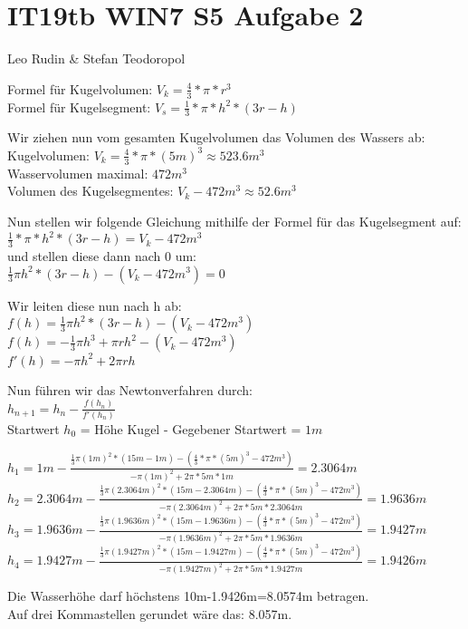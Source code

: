\documentclass{article}
\begin{document}
\section*{IT19tb WIN7 S5 Aufgabe 2}
Leo Rudin \& Stefan Teodoropol

Formel für Kugelvolumen: \(V_k = \frac{4}{3}*\pi*r^3\)\\
Formel für Kugelsegment: \(V_s = \frac{1}{3}*\pi*h^2*(3r-h)\)

Wir ziehen nun vom gesamten Kugelvolumen das Volumen des Wassers ab:\\
Kugelvolumen: \(V_k = \frac{4}{3}*\pi*(5m)^3 \approx 523.6m^3\)\\
Wasservolumen maximal: \(472m^3\)\\
Volumen des Kugelsegmentes: \(V_k - 472m^3 \approx 52.6m^3\)

Nun stellen wir folgende Gleichung mithilfe der Formel für das Kugelsegment auf:\\
\(\frac{1}{3}*\pi*h^2*(3r-h) = V_k - 472m^3\)\\
und stellen diese dann nach 0 um:\\
\(\frac{1}{3} \pi h^2*(3r-h) - (V_k - 472m^3) = 0\)

Wir leiten diese nun nach h ab:\\
\(f(h) = \frac{1}{3} \pi h^2*(3r-h) - (V_k - 472m^3)\)\\
\(f(h) = - \frac{1}{3} \pi h^3 + \pi r h^2 - (V_k - 472m^3)\)\\
\(f'(h) = - \pi h^2  + 2 \pi r h\)

Nun führen wir das Newtonverfahren durch:\\
\(h_{n+1} = h_n - \frac{f(h_n)}{f'(h_n)}\)\\
Startwert \(h_0\) = Höhe Kugel - Gegebener Startwert = \(1m\)

\(h_1 = 1m - \frac{\frac{1}{3} \pi (1m)^2*(15m-1m) - (\frac{4}{3}*\pi*(5m)^3 - 472m^3)}{- \pi (1m)^2  + 2 \pi * 5m * 1m} = 2.3064m\)\\
\(h_2 = 2.3064m - \frac{\frac{1}{3} \pi (2.3064m)^2*(15m-2.3064m) - (\frac{4}{3}*\pi*(5m)^3 - 472m^3)}{- \pi (2.3064m)^2  + 2 \pi * 5m * 2.3064m} = 1.9636m\)\\
\(h_3 = 1.9636m - \frac{\frac{1}{3} \pi (1.9636m)^2*(15m-1.9636m) - (\frac{4}{3}*\pi*(5m)^3 - 472m^3)}{- \pi (1.9636m)^2  + 2 \pi * 5m * 1.9636m} = 1.9427m\)\\
\(h_4 = 1.9427m - \frac{\frac{1}{3} \pi (1.9427m)^2*(15m-1.9427m) - (\frac{4}{3}*\pi*(5m)^3 - 472m^3)}{- \pi (1.9427m)^2  + 2 \pi * 5m * 1.9427m} = 1.9426m\)

Die Wasserhöhe darf höchstens 10m-1.9426m=8.0574m betragen.\\
Auf drei Kommastellen gerundet wäre das: 8.057m.
\end{document}

